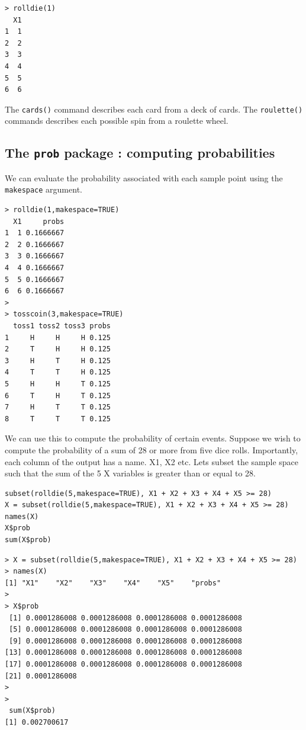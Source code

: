 \documentclass[11pt]{article} %
\begin{document}
\begin{verbatim}
> rolldie(1)
  X1
1  1
2  2
3  3
4  4
5  5
6  6
\end{verbatim}

The \texttt{cards()} command describes each card from a deck of cards. The \texttt{roulette()} commands describes each possible spin from a roulette wheel.
\newpage
\subsection{The \texttt{prob} package : computing probabilities}
We can evaluate the probability associated with each sample point using the \texttt{makespace} argument.
\begin{verbatim}
> rolldie(1,makespace=TRUE)
  X1     probs
1  1 0.1666667
2  2 0.1666667
3  3 0.1666667
4  4 0.1666667
5  5 0.1666667
6  6 0.1666667
>
> tosscoin(3,makespace=TRUE)
  toss1 toss2 toss3 probs
1     H     H     H 0.125
2     T     H     H 0.125
3     H     T     H 0.125
4     T     T     H 0.125
5     H     H     T 0.125
6     T     H     T 0.125
7     H     T     T 0.125
8     T     T     T 0.125
\end{verbatim}
We can use this to compute the probability of certain events. Suppose we wish to compute the probability of a sum of 28 or more from five dice rolls. Importantly, each column of the output has a name. X1, X2 etc. Lets subset the sample space such that the sum of the 5 X variables is greater than or equal to 28. 
\begin{framed}
\begin{verbatim}
subset(rolldie(5,makespace=TRUE), X1 + X2 + X3 + X4 + X5 >= 28)
X = subset(rolldie(5,makespace=TRUE), X1 + X2 + X3 + X4 + X5 >= 28)
names(X)
X$prob
sum(X$prob)
\end{verbatim}
\end{framed}
\newpage
\begin{verbatim}
> X = subset(rolldie(5,makespace=TRUE), X1 + X2 + X3 + X4 + X5 >= 28)
> names(X)
[1] "X1"    "X2"    "X3"    "X4"    "X5"    "probs"
>
> X$prob
 [1] 0.0001286008 0.0001286008 0.0001286008 0.0001286008
 [5] 0.0001286008 0.0001286008 0.0001286008 0.0001286008
 [9] 0.0001286008 0.0001286008 0.0001286008 0.0001286008
[13] 0.0001286008 0.0001286008 0.0001286008 0.0001286008
[17] 0.0001286008 0.0001286008 0.0001286008 0.0001286008
[21] 0.0001286008
>
>
 sum(X$prob)
[1] 0.002700617
\end{verbatim}

\newpage
\end{document}
